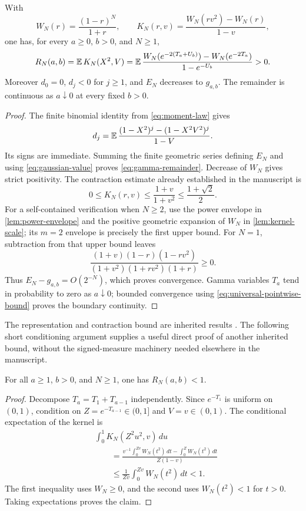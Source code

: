 \begin{proposition}
\label{prop:gamma-remainder}
With
\[
 W_N(r)=\frac{(1-r)^N}{1+r},\qquad
 K_N(r,v)=\frac{W_N(rv^2)-W_N(r)}{1-v},
\]
one has, for every $a\geq0$, $b>0$, and $N\geq1$,
\begin{equation}\label{eq:gamma-remainder}
 R_N(a,b)=\operatorname{\mathbb E} K_N(X^2,V)
 =\operatorname{\mathbb E}\frac{W_N(e^{-2(T_a+U_b)})-W_N(e^{-2T_a})}
             {1-e^{-U_b}}>0.
\end{equation}
Moreover $d_0=0$, $d_j<0$ for $j\geq1$, and $E_N$ decreases to
$g_{a,b}$. The remainder is continuous as $a\downarrow0$ at every
fixed $b>0$.
\end{proposition}
\begin{proof}
The finite binomial identity from \eqref{eq:moment-law} gives
\[
 d_j=\operatorname{\mathbb E}\frac{(1-X^2)^j-(1-X^2V^2)^j}{1-V}.
\]
Its signs are immediate. Summing the finite geometric series defining
$E_N$ and using \eqref{eq:gaussian-value} proves
\eqref{eq:gamma-remainder}. Decrease of $W_N$ gives strict positivity.
The contraction estimate already established in the manuscript is
\begin{equation}\label{eq:universal-pointwise-bound}
 0\leq K_N(r,v)\leq\frac{1+v}{1+v^2}
       \leq\frac{1+\sqrt2}{2}.
\end{equation}
For a self-contained verification when $N\geq2$, use the power envelope
in \cref{lem:power-envelope} and the positive geometric expansion of
$W_N$ in \cref{lem:kernel-scale}; its $m=2$ envelope is precisely the
first upper bound. For $N=1$, subtraction from that upper bound leaves
\[
 \frac{(1+v)(1-r)(1-rv^2)}
       {(1+v^2)(1+rv^2)(1+r)}\geq0.
\]
Thus $E_N-g_{a,b}=O(2^{-N})$, which proves convergence. Gamma
variables $T_a$ tend in probability to zero as $a\downarrow0$; bounded
convergence using \eqref{eq:universal-pointwise-bound} proves the
boundary continuity.
\end{proof}

The representation and contraction bound are inherited results
\cite{ProveItSnapshot,SharpEulerIncoming}. The following short
conditioning argument supplies a useful direct proof of another
inherited bound, without the signed-measure machinery needed elsewhere
in the manuscript.

\begin{lemma}
\label{lem:outer-order-one}
For all $a\geq1$, $b>0$, and $N\geq1$, one has $R_N(a,b)<1$.
\end{lemma}
\begin{proof}
Decompose $T_a=T_1+T_{a-1}$ independently. Since $e^{-T_1}$ is
uniform on $(0,1)$, condition on $Z=e^{-T_{a-1}}\in(0,1]$ and
$V=v\in(0,1)$. The conditional expectation of the kernel is
\begin{align*}
 &\int_0^1 K_N(Z^2u^2,v)\,du\\
 &\qquad=\frac{v^{-1}\int_0^{Zv}W_N(t^2)\,dt
                         -\int_0^Z W_N(t^2)\,dt}{Z(1-v)}\\
 &\qquad\leq\frac1{Zv}\int_0^{Zv}W_N(t^2)\,dt<1.
\end{align*}
The first inequality uses $W_N\geq0$, and the second uses
$W_N(t^2)<1$ for $t>0$. Taking expectations proves the claim.
\end{proof}

